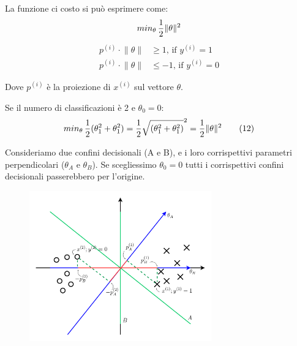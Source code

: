 \begin{definizione}
  La funzione ci costo si può esprimere come:
  \[min_\theta \, {1 \over 2 } \lVert \theta \rVert^2 \]
\begin{align*}
p^{(i)} \cdot \lVert \theta \rVert &\geq 1 \text{, if } y^{(i)}=1 \\
p^{(i)} \cdot \lVert \theta \rVert &\leq -1 \text{, if } y^{(i)}=0
\end{align*} %
\begin{nota}
Dove $p^{(i)}$ è la proiezione di $x^{(i)}$ sul vettore $\theta$.
\end{nota}
\end{definizione}
  \begin{esempio}
    Se il numero di classificazioni è 2 e $\theta_0 = 0$:
    \[min_\theta \, {1 \over 2 } (\theta_1^2 + \theta_1^2) = {1 \over 2 } \sqrt{(\theta_1^2 + \theta_1^2)}^2 =  {1 \over 2 } \lVert \theta \rVert^2 \tag{12} \label{12}\]
  \end{esempio}
Consideriamo due confini decisionali (A e B), e i loro corrispettivi parametri perpendicolari ($\theta_A$ e $\theta_B$). Se scegliessimo $\theta_0 = 0$ tutti i corrispettivi confini decisionali passerebbero per l'origine.
  \begin{figure}[H]
    \centering
    \includegraphics[width=0.7\textwidth]{img/fig-8-choosing-large-margin.png}
\end{figure}
